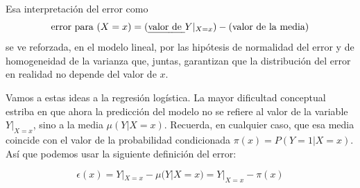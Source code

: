 	Esa interpretación del error como
	\[
	\mbox{error para }(X=x) = (\mbox{\em valor de }Y|_{X=x}) - \mbox{(valor de la media)}
	\]
	se ve reforzada, en el modelo lineal, por las hipótesis de normalidad del error y de homogeneidad de la varianza que,  juntas, garantizan que la distribución del error en realidad no depende del valor de $x$.
	
	Vamos a estas ideas a la regresión logística. La mayor dificultad conceptual estriba en que ahora la predicción del modelo no se refiere al valor de la variable $Y|_{X=x}$, sino a la media  $\mu(Y|X=x)$.  Recuerda, en cualquier caso, que esa media  coincide con el valor de la probabilidad condicionada $\pi(x)= P(Y=1|X=x)$. Así que podemos usar la siguiente definición del error:
	
	\begin{equation}
	\label{cap13:ecu:ErrorRegresionLogistica}
	\epsilon(x) =  Y|_{X=x} - \mu(Y|X= x) = Y|_{X=x} - \pi(x)
	\end{equation}
	
